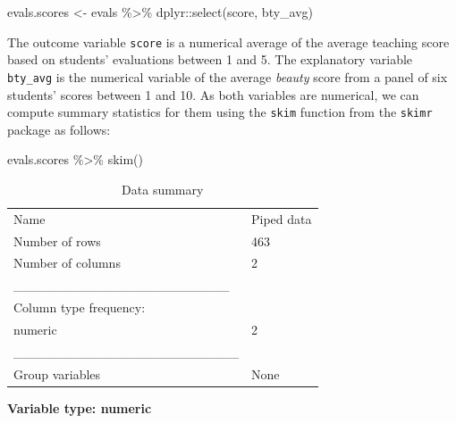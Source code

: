 \documentclass[
  letterpaper,
  DIV=11,
  numbers=noendperiod]{scrartcl}
\newenvironment{Shaded}{\begin{snugshade}}{\end{snugshade}}
\newcommand{\FunctionTok}[1]{\textcolor[rgb]{0.28,0.35,0.67}{#1}}
\newcommand{\NormalTok}[1]{\textcolor[rgb]{0.00,0.23,0.31}{#1}}
\newcommand{\OtherTok}[1]{\textcolor[rgb]{0.00,0.23,0.31}{#1}}
\newcommand{\SpecialCharTok}[1]{\textcolor[rgb]{0.37,0.37,0.37}{#1}}
\begin{document}
\begin{Shaded}
\begin{Highlighting}[]
\NormalTok{evals.scores }\OtherTok{\textless{}{-}}\NormalTok{ evals }\SpecialCharTok{\%\textgreater{}\%}
\NormalTok{  dplyr}\SpecialCharTok{::}\FunctionTok{select}\NormalTok{(score, bty\_avg)}
\end{Highlighting}
\end{Shaded}

The outcome variable \texttt{score} is a numerical average of the
average teaching score based on students' evaluations between 1 and 5.
The explanatory variable \texttt{bty\_avg} is the numerical variable of
the average \emph{beauty} score from a panel of six students' scores
between 1 and 10. As both variables are numerical, we can compute
summary statistics for them using the \texttt{skim} function from the
\texttt{skimr} package as follows:

\begin{Shaded}
\begin{Highlighting}[]
\NormalTok{evals.scores }\SpecialCharTok{\%\textgreater{}\%}
  \FunctionTok{skim}\NormalTok{()}
\end{Highlighting}
\end{Shaded}

\begin{longtable}[]{@{}ll@{}}
\caption{Data summary}\tabularnewline
\toprule\noalign{}
\endfirsthead
\endhead
\bottomrule\noalign{}
\endlastfoot
Name & Piped data \\
Number of rows & 463 \\
Number of columns & 2 \\
\_\_\_\_\_\_\_\_\_\_\_\_\_\_\_\_\_\_\_\_\_\_\_ & \\
Column type frequency: & \\
numeric & 2 \\
\_\_\_\_\_\_\_\_\_\_\_\_\_\_\_\_\_\_\_\_\_\_\_\_ & \\
Group variables & None \\
\end{longtable}

\textbf{Variable type: numeric}
\end{document}

